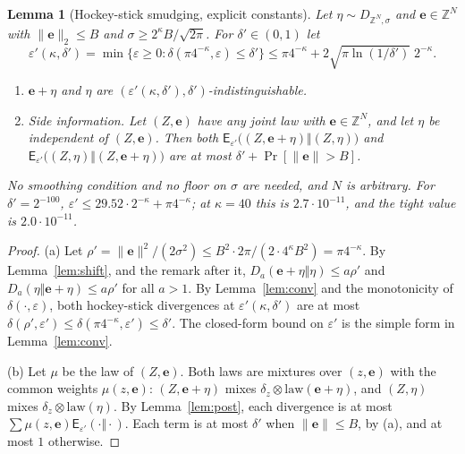 \documentclass[11pt]{article}
\theoremstyle{definition}
\theoremstyle{plain}
\newtheorem{lemma}[definition]{Lemma}
\newcommand{\Z}{\mathbb{Z}}
\newcommand{\nrm}[1]{\lVert #1\rVert}
\newcommand{\HSd}{\mathsf{E}}
\begin{document}
\begin{lemma}[Hockey-stick smudging, explicit constants]\label{lem:hssmudge}
Let $\eta\sim D_{\Z^N,\sigma}$ and $\mathbf e\in\Z^N$ with $\nrm{\mathbf e}_2\le B$ and $\sigma\ge2^\kappa B/\sqrt{2\pi}$. For $\delta'\in(0,1)$ let
\[
  \varepsilon'(\kappa,\delta')=\min\{\varepsilon\ge0:\delta(\pi4^{-\kappa},\varepsilon)\le\delta'\}\le\pi4^{-\kappa}+2\sqrt{\pi\ln(1/\delta')}\;2^{-\kappa}.
\]
\begin{enumerate}[nosep,label=(\alph*)]
  \item $\mathbf e+\eta$ and $\eta$ are $(\varepsilon'(\kappa,\delta'),\delta')$-indistinguishable.
  \item \emph{Side information.} Let $(Z,\mathbf e)$ have any joint law with $\mathbf e\in\Z^N$, and let $\eta$ be independent of $(Z,\mathbf e)$. Then both $\HSd_{\varepsilon'}\bigl((Z,\mathbf e+\eta)\Vert(Z,\eta)\bigr)$ and $\HSd_{\varepsilon'}\bigl((Z,\eta)\Vert(Z,\mathbf e+\eta)\bigr)$ are at most $\delta'+\Pr[\nrm{\mathbf e}>B]$.
\end{enumerate}
No smoothing condition and no floor on $\sigma$ are needed, and $N$ is arbitrary. For $\delta'=2^{-100}$, $\varepsilon'\le29.52\cdot2^{-\kappa}+\pi4^{-\kappa}$; at $\kappa=40$ this is $2.7\cdot10^{-11}$, and the tight value is $2.0\cdot10^{-11}$.
\end{lemma}
\begin{proof}
(a) Let $\rho'=\nrm{\mathbf e}^2/(2\sigma^2)\le B^2\cdot2\pi/(2\cdot4^\kappa B^2)=\pi4^{-\kappa}$. By Lemma~\ref{lem:shift}, and the remark after it, $D_a(\mathbf e+\eta\Vert\eta)\le a\rho'$ and $D_a(\eta\Vert\mathbf e+\eta)\le a\rho'$ for all $a>1$. By Lemma~\ref{lem:conv} and the monotonicity of $\delta(\cdot,\varepsilon)$, both hockey-stick divergences at $\varepsilon'(\kappa,\delta')$ are at most $\delta(\rho',\varepsilon')\le\delta(\pi4^{-\kappa},\varepsilon')\le\delta'$. The closed-form bound on $\varepsilon'$ is the simple form in Lemma~\ref{lem:conv}.

(b) Let $\mu$ be the law of $(Z,\mathbf e)$. Both laws are mixtures over $(z,\mathbf e)$ with the common weights $\mu(z,\mathbf e)$: $(Z,\mathbf e+\eta)$ mixes $\delta_z\otimes\mathrm{law}(\mathbf e+\eta)$, and $(Z,\eta)$ mixes $\delta_z\otimes\mathrm{law}(\eta)$. By Lemma~\ref{lem:post}, each divergence is at most $\sum\mu(z,\mathbf e)\HSd_{\varepsilon'}(\cdot\Vert\cdot)$. Each term is at most $\delta'$ when $\nrm{\mathbf e}\le B$, by (a), and at most $1$ otherwise.
\end{proof}
\end{document}
